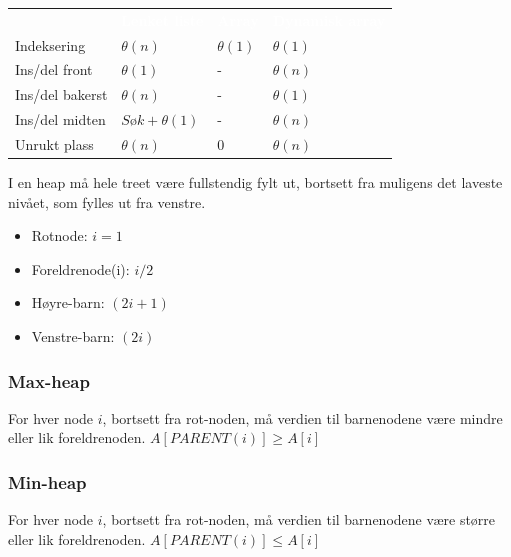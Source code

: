 \begin{table}[H]
    \label{tab:heap}
    \centering
    \begin{tabular}{|L{10em} | L{10em}| L{10em}|L{10em}|}
        \hline
        \textbf{\textcolor{white}{}} & \textbf{\textcolor{white}{Lenket liste}} & \textbf{\textcolor{white}{Array}} & \textbf{\textcolor{white}{Dynamisk array}}\\
        Indeksering & $\theta(n)$ & $\theta(1)$ & $\theta(1)$\\
        Ins/del front & $\theta(1)$ & - & $\theta(n)$\\
        Ins/del bakerst & $\theta(n)$ & - & $\theta(1)$\\
        Ins/del midten & $Søk + \theta(1)$ & - & $\theta(n)$\\
        Unrukt plass & $\theta(n)$ & 0 & $\theta(n)$\\
         \hline
    \end{tabular}
\end{table}

\noindent I en heap må hele treet være fullstendig fylt ut, bortsett fra muligens det laveste nivået, som fylles ut fra venstre.
\begin{itemize}
    \item Rotnode: $i = 1$
    \item Foreldrenode(i): $i/2$
    \item Høyre-barn: $(2i + 1)$
    \item Venstre-barn: $(2i)$
\end{itemize}

\subsubsection{Max-heap}
For hver node $i$, bortsett fra rot-noden, må verdien til barnenodene være mindre eller lik foreldrenoden. $A[PARENT(i)]\geq A[i]$

\subsubsection{Min-heap}
For hver node $i$, bortsett fra rot-noden, må verdien til barnenodene være større eller lik foreldrenoden. $A[PARENT(i)]\leq A[i]$



